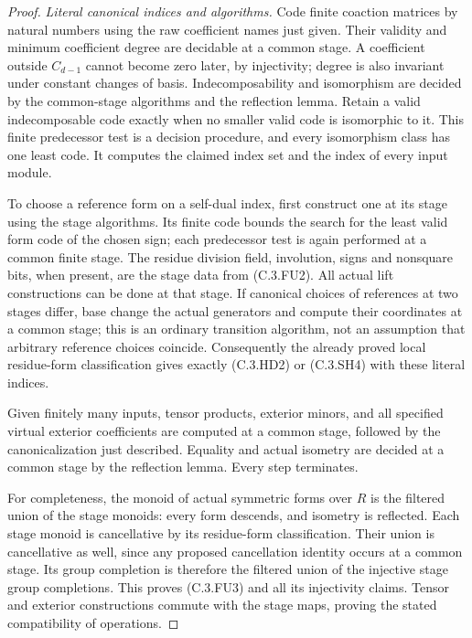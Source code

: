 \begin{proof}
\emph{Literal canonical indices and algorithms.}
Code finite coaction matrices by natural numbers
using the raw coefficient names just given.
Their validity and minimum coefficient degree
are decidable at a common stage.  A coefficient
outside $C_{d-1}$ cannot become zero later,
by injectivity; degree is also invariant under
constant changes of basis.
Indecomposability and isomorphism are decided by
the common-stage algorithms and the reflection
lemma.  Retain a valid indecomposable code exactly
when no smaller valid code is isomorphic to it.
This finite predecessor test is a decision
procedure, and every isomorphism class has one
least code.  It computes the claimed index set
and the index of every input module.

To choose a reference form on a self-dual index,
first construct one at its stage using the
stage algorithms.  Its finite code bounds the
search for the least valid form code of the
chosen sign; each predecessor test is again
performed at a common finite stage.
The residue division field, involution, signs
and nonsquare bits, when present, are the stage
data from (C.3.FU2).  All actual lift constructions
can be done at that stage.  If canonical choices
of references at two stages differ, base change
the actual generators and compute their coordinates
at a common stage; this is an ordinary transition
algorithm, not an assumption that arbitrary
reference choices coincide.
Consequently the already proved local residue-form
classification gives exactly (C.3.HD2) or (C.3.SH4)
with these literal indices.

Given finitely many inputs, tensor products,
exterior minors, and all specified virtual
exterior coefficients are computed at a common
stage, followed by the canonicalization just
described.  Equality and actual isometry are
decided at a common stage by the reflection
lemma.  Every step terminates.

For completeness, the monoid of actual symmetric
forms over $R$ is the filtered union of the stage
monoids: every form descends, and isometry is
reflected.  Each stage monoid is cancellative
by its residue-form classification.  Their union
is cancellative as well, since any proposed
cancellation identity occurs at a common stage.
Its group completion is therefore the filtered
union of the injective stage group completions.
This proves (C.3.FU3) and all its injectivity
claims.  Tensor and exterior constructions
commute with the stage maps, proving the stated
compatibility of operations.
\end{proof}

